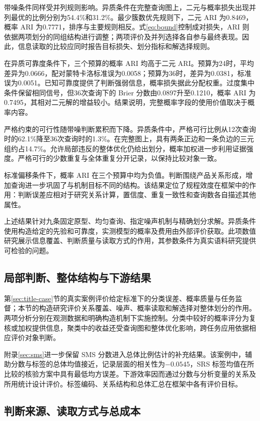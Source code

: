 \documentclass[UTF8,a4paper,zihao=-4,fontset=fandol]{ctexart}
\begin{document}
带噪条件同样受并列规则影响。异质条件在完整查询图上，二元与概率损失出现并列最优的比例分别为54.4\%和31.2\%。最少簇数优先规则下，二元 ARI 为0.8469，概率 ARI 为0.7771，排序与主要规则相反。式\eqref{eq:bound}控制成对损失，ARI 则依据两项划分的同组结构进行调整；两项评价及并列选择各自参与最终表现。因此，信息读取的比较应同时报告目标损失、划分指标和解选择规则。

在异质可靠度条件下，三个预算的概率 ARI 均高于二元 ARI。预算为24时，平均差异为0.0666，配对蒙特卡洛标准误为0.0058；预算为36时，差异为0.0381，标准误为0.0051。已知可靠度提供了判断强弱信息，概率损失据此分配权重。过度集中条件保留相同信号，但36次查询下的 Brier 分数由0.0897升至0.1210，概率 ARI 为0.7495，其相对二元解的增益较小。结果说明，完整概率字段的使用价值取决于概率内容。

严格约束的可行性随带噪判断累积而下降。异质条件中，严格可行比例从12次查询时的62.1\%降至36次查询时的1.3\%。在完整图上，具有两条正边和一条负边的三元组约占14.7\%。允许局部违反的整体优化仍给出划分，概率加权进一步利用证据强度。严格可行的少数重复与全体重复分开记录，以保持比较对象一致。

标准偏移条件下，概率 ARI 在三个预算中均为负值。判断围绕产品关系形成，增加查询进一步巩固了与机制目标不同的结构。该结果定位了规程效度在框架中的作用：判断误差应相对于研究关系计算，置信度、重复一致性和查询数各自描述其他属性。

上述结果针对九条固定原型、均匀查询、指定噪声机制与精确划分求解。异质条件使用构造给定的先验和可靠度，实测模型的概率及费用由外部评价获取。此项数值研究展示信息覆盖、判断质量与读取方式的作用，其参数条件为真实语料研究提供可检验的问题。

\subsection{局部判断、整体结构与下游结果}

第\ref{sec:title-case}节的真实案例评价给定标准下的分类误差、概率质量与任务监督；本节的构造研究评价关系覆盖、噪声、概率读取和解选择对整体划分的作用。两项分析分别在观测数据和明确构造机制下实施控制。分类中较好的概率评分为复核或加权提供信息，聚类中的收益还受查询图和整体优化影响，跨任务应用依据相应评价对象判断。

附录\ref{sec:sms}进一步保留 SMS 分数进入总体比例估计的补充结果。该案例中，辅助分数与标签的总体均值接近，记录层面的相关性为$-0.0545$，SRS 标签均值在所比较的核验方案中具有最低均方误差。下游效率因而通过分数与分析变量的关系及所用统计设计评价。标签编码、关系结构和总体汇总在框架中各有评价目标。


\subsection{判断来源、读取方式与总成本}\label{sec:agenda}
\end{document}
